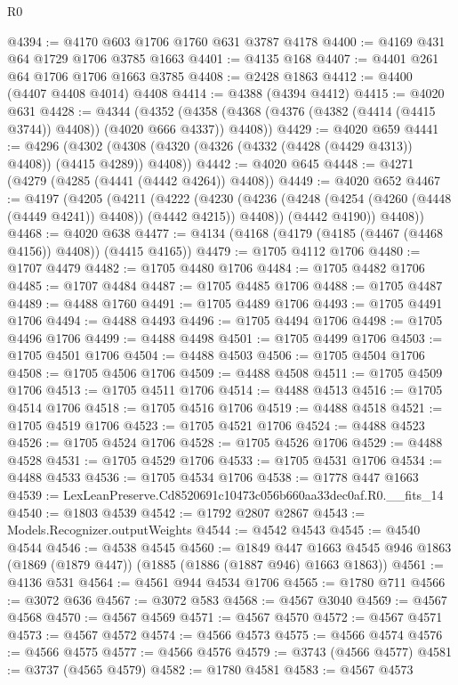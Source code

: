 \begin{lexlean}{R0}
\begin{coremodule}
@4394 := @4170 @603 @1706 @1760 @631 @3787 @4178
@4400 := @4169 @431 @64 @1729 @1706 @3785 @1663
@4401 := @4135 @168
@4407 := @4401 @261 @64 @1706 @1706 @1663 @3785
@4408 := @2428 @1863
@4412 := @4400 (@4407 @4408 @4014) @4408
@4414 := @4388 (@4394 @4412)
@4415 := @4020 @631
@4428 := @4344
    (@4352 (@4358 (@4368 (@4376 (@4382 (@4414 (@4415 @3744)) @4408)) (@4020 @666 @4337)) @4408))
@4429 := @4020 @659
@4441 := @4296
    (@4302 (@4308 (@4320 (@4326 (@4332 (@4428 (@4429 @4313)) @4408)) (@4415 @4289)) @4408))
@4442 := @4020 @645
@4448 := @4271 (@4279 (@4285 (@4441 (@4442 @4264)) @4408))
@4449 := @4020 @652
@4467 := @4197
    (@4205
      (@4211
        (@4222
          (@4230 (@4236 (@4248 (@4254 (@4260 (@4448 (@4449 @4241)) @4408)) (@4442 @4215)) @4408))
          (@4442 @4190))
        @4408))
@4468 := @4020 @638
@4477 := @4134 (@4168 (@4179 (@4185 (@4467 (@4468 @4156)) @4408)) (@4415 @4165))
@4479 := @1705 @4112 @1706
@4480 := @1707 @4479
@4482 := @1705 @4480 @1706
@4484 := @1705 @4482 @1706
@4485 := @1707 @4484
@4487 := @1705 @4485 @1706
@4488 := @1705 @4487
@4489 := @4488 @1760
@4491 := @1705 @4489 @1706
@4493 := @1705 @4491 @1706
@4494 := @4488 @4493
@4496 := @1705 @4494 @1706
@4498 := @1705 @4496 @1706
@4499 := @4488 @4498
@4501 := @1705 @4499 @1706
@4503 := @1705 @4501 @1706
@4504 := @4488 @4503
@4506 := @1705 @4504 @1706
@4508 := @1705 @4506 @1706
@4509 := @4488 @4508
@4511 := @1705 @4509 @1706
@4513 := @1705 @4511 @1706
@4514 := @4488 @4513
@4516 := @1705 @4514 @1706
@4518 := @1705 @4516 @1706
@4519 := @4488 @4518
@4521 := @1705 @4519 @1706
@4523 := @1705 @4521 @1706
@4524 := @4488 @4523
@4526 := @1705 @4524 @1706
@4528 := @1705 @4526 @1706
@4529 := @4488 @4528
@4531 := @1705 @4529 @1706
@4533 := @1705 @4531 @1706
@4534 := @4488 @4533
@4536 := @1705 @4534 @1706
@4538 := @1778 @447 @1663
@4539 := LexLeanPreserve.Cd8520691c10473c056b660aa33dec0af.R0.__fits_14
@4540 := @1803 @4539
@4542 := @1792 @2807 @2867
@4543 := Models.Recognizer.outputWeights
@4544 := @4542 @4543
@4545 := @4540 @4544
@4546 := @4538 @4545
@4560 := @1849
    @447
    @1663
    @4545
    @946
    @1863
    (@1869 (@1879 @447))
    (@1885 (@1886 (@1887 @946) @1663 @1863))
@4561 := @4136 @531
@4564 := @4561 @944 @4534 @1706
@4565 := @1780 @711
@4566 := @3072 @636
@4567 := @3072 @583
@4568 := @4567 @3040
@4569 := @4567 @4568
@4570 := @4567 @4569
@4571 := @4567 @4570
@4572 := @4567 @4571
@4573 := @4567 @4572
@4574 := @4566 @4573
@4575 := @4566 @4574
@4576 := @4566 @4575
@4577 := @4566 @4576
@4579 := @3743 (@4566 @4577)
@4581 := @3737 (@4565 @4579)
@4582 := @1780 @4581
@4583 := @4567 @4573

\end{coremodule}
\end{lexlean}
